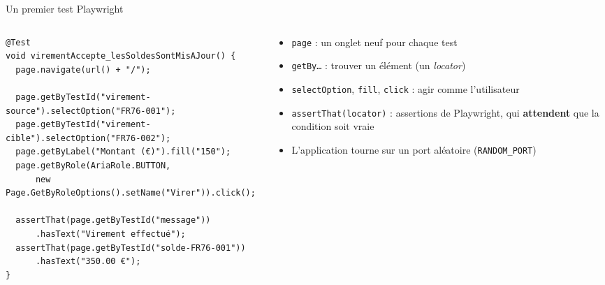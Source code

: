 \documentclass[aspectratio=169,10pt]{beamer}
\begin{document}
\begin{frame}[fragile]{Un premier test Playwright}
  \begin{columns}[T]
    \begin{column}{0.64\textwidth}
\begin{lstlisting}[basicstyle=\lstcode\scriptsize]
@Test
void virementAccepte_lesSoldesSontMisAJour() {
  page.navigate(url() + "/");

  page.getByTestId("virement-source").selectOption("FR76-001");
  page.getByTestId("virement-cible").selectOption("FR76-002");
  page.getByLabel("Montant (€)").fill("150");
  page.getByRole(AriaRole.BUTTON,
      new Page.GetByRoleOptions().setName("Virer")).click();

  assertThat(page.getByTestId("message"))
      .hasText("Virement effectué");
  assertThat(page.getByTestId("solde-FR76-001"))
      .hasText("350.00 €");
}
\end{lstlisting}
    \end{column}
    \begin{column}{0.33\textwidth}
      \small
      \begin{itemize}
        \item \texttt{page} : un onglet neuf pour chaque test
        \item \texttt{getBy\ldots} : trouver un élément (un \textit{locator})
        \item \texttt{selectOption}, \texttt{fill}, \texttt{click} : agir comme l'utilisateur
        \item \texttt{assertThat(locator)} : assertions de Playwright, qui \textbf{attendent} que la condition soit vraie
        \item L'application tourne sur un port aléatoire (\texttt{RANDOM\_PORT})
      \end{itemize}
    \end{column}
  \end{columns}
\end{frame}
\end{document}
